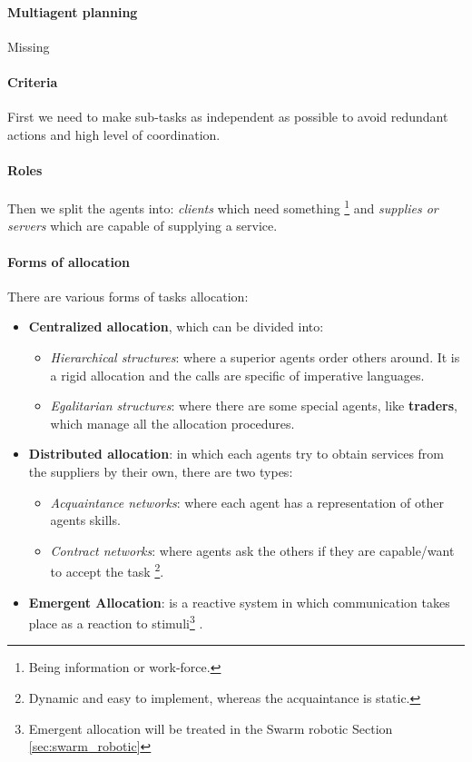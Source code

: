 \documentclass[10pt,a4paper]{article}
\begin{document}
\paragraph{Multiagent planning} Missing

\paragraph{Criteria}
First we need to make sub-tasks as independent as possible to avoid redundant actions and high level of coordination.

\paragraph{Roles}
Then we split the agents into: \textit{clients} which need something \footnote{Being information or work-force.} and \textit{supplies or servers} which are capable of supplying a service.

\paragraph{Forms of allocation}
There are various forms of tasks allocation:
\begin{itemize}
\item \textbf{Centralized allocation}, which can be divided into:

	\begin{itemize}
	\item \textit{Hierarchical structures}: where a superior agents order others around. It is a rigid allocation and the calls are specific of imperative languages.
	\item \textit{Egalitarian structures}: where there are some special agents, like \textbf{traders}, which manage all the allocation procedures.
	\end{itemize}

\item \textbf{Distributed allocation}: in which each agents try to obtain services from the suppliers by their own, there are two types:

	\begin{itemize}
	\item \textit{Acquaintance networks}: where each agent has a representation of other agents skills.
	\item \textit{Contract networks}: where agents ask the others if they are capable/want to accept the task \footnote{ Dynamic and easy to implement, whereas the acquaintance is static.}.
	\end{itemize}
	
	
\item \textbf{Emergent Allocation}:  is a reactive system in which communication takes place as a reaction to stimuli\footnote{Emergent allocation will be treated in the Swarm robotic Section \ref{sec:swarm_robotic}} .	
\end{itemize}
\end{document}
